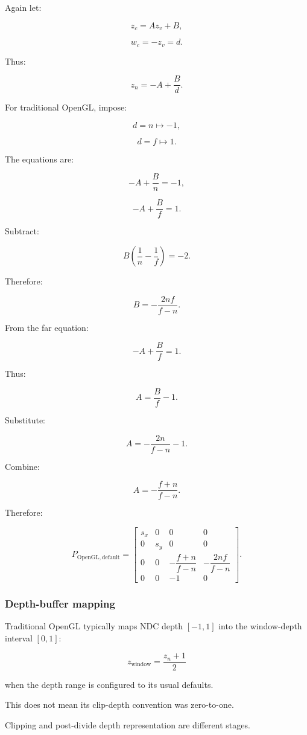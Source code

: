 Again let:

\[
 z_c=Az_v+B,
\]

\[
 w_c=-z_v=d.
\]

Thus:

\[
 z_n=-A+\frac Bd.
\]

For traditional OpenGL, impose:

\[
 d=n\mapsto-1,
\]

\[
 d=f\mapsto1.
\]

The equations are:

\[
 -A+\frac Bn=-1,
\]

\[
 -A+\frac Bf=1.
\]

Subtract:

\[
 B\left(\frac1n-\frac1f\right)=-2.
\]

Therefore:

\[
 B=-\frac{2nf}{f-n}.
\]

From the far equation:

\[
 -A+\frac Bf=1.
\]

Thus:

\[
 A=\frac Bf-1.
\]

Substitute:

\[
 A=-\frac{2n}{f-n}-1.
\]

Combine:

\[
 \boxed{ A=-\frac{f+n}{f-n} }.
\]

Therefore:

\[
 \boxed{ P_{\mathrm{OpenGL,default}}= \begin{bmatrix} s_x&0&0&0\\ 0&s_y&0&0\\ 0&0&-\dfrac{f+n}{f-n}&-\dfrac{2nf}{f-n}\\ 0&0&-1&0 \end{bmatrix} }.
\]

\subsubsection{Depth-buffer mapping}\label{depth-buffer-mapping}

Traditional OpenGL typically maps NDC depth \([-1,1]\) into the window-depth interval \([0,1]\):

\[
 \boxed{ z_{\mathrm{window}}=\frac{z_n+1}{2} }
\]

when the depth range is configured to its usual defaults.

This does not mean its clip-depth convention was zero-to-one.

Clipping and post-divide depth representation are different stages.

